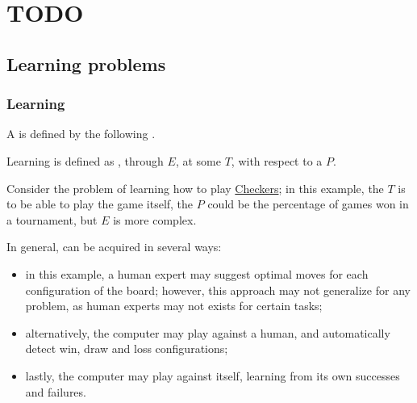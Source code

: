 \documentclass[a4paper, 12pt]{report}
\institute{\curlyquotes{\hspace{0.25mm}Sapienza} Università di Roma}
\subtitle{Appunti integrati con il libro \book}
\author{\textit{Autore}\\\authorName}
\institute{\curlyquotes{\hspace{0.25mm}Sapienza} University of Rome}
\subtitle{Lecture notes integrated with the book \book}
\author{\textit{Author}\\\authorName}
\title{\courseName}
\date{\today}
\begin{document}
    \maketitle

    {
        \hypersetup{allcolors=black}

        \romantableofcontents
    }

    \introduction

    
    \chapter{TODO}
    
    \section{Learning problems}

    \subsection{Learning}

    A  is defined by the following .

    \begin{frameddefn}{Learning}
         is defined as , through  $E$, at some  $T$, with respect to a  $P$.
    \end{frameddefn}

    \begin{example}
        Consider the problem of learning how to play \href{https://en.wikipedia.org/wiki/Checkers}{Checkers}; in this example, the  $T$ is to be able to play the game itself, the  $P$ could be the percentage of games won in a tournament, but  $E$ is more complex.
    \end{example}

    In general,  can be acquired in several ways:

    \begin{itemize}
        \item in this example, a human expert may suggest optimal moves for each configuration of the board; however, this approach may not generalize for any problem, as human experts may not exists for certain tasks;
        \item alternatively, the computer may play against a human, and automatically detect win, draw and loss configurations;
        \item lastly, the computer may play against itself, learning from its own successes and failures.
    \end{itemize}
\end{document}
